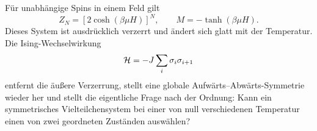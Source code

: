 Für unabhängige Spins in einem Feld gilt
\begin{equation}
 Z_N=\left[2\cosh(\beta\mu H)\right]^N,
 \qquad
 M=-\tanh(\beta\mu H).
 \label{eq:sm8-summary-spins}
\end{equation}
Dieses System ist ausdrücklich verzerrt und ändert sich glatt mit der Temperatur. Die Ising-Wechselwirkung
\begin{equation}
 {\cal H}=-J\sum_i\sigma_i\sigma_{i+1}
 \label{eq:sm8-summary-ising}
\end{equation}
entfernt die äußere Verzerrung, stellt eine globale Aufwärts--Abwärts-Symmetrie wieder her und stellt die eigentliche Frage nach der Ordnung: Kann ein symmetrisches Vielteilchensystem bei einer von null verschiedenen Temperatur einen von zwei geordneten Zuständen auswählen?
